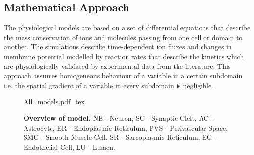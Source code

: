 \subsection{Mathematical Approach}
The physiological models are based on a set of differential equations that describe the mass conservation of ions and molecules passing from one cell or domain to another. The simulations describe time-dependent ion fluxes and changes in membrane potential modelled by reaction rates that describe the kinetics which are physiologically validated by experimental data from the literature. This approach assumes homogeneous behaviour of a variable in a certain subdomain i.e. the spatial gradient of a variable in every subdomain is negligible.

 \begin{figure}[h!]
   \centering
   \def\svgwidth{450pt}
   \scriptsize 
   {All_models.pdf_tex}
   \caption{\textbf{Overview of model.}  \gls{NE} - Neuron, \gls{SC} - Synaptic Cleft, \gls{AC}  - Astrocyte,  \gls{ER}  - Endoplasmic Reticulum,  \gls{PVS}  - Perivascular Space,  \gls{SMC}  - Smooth Muscle Cell, SR - Sarcoplasmic Reticulum,  \gls{EC}  - Endothelial Cell,     \gls{LU}  - Lumen. }
 \label{Overview1}
 \end{figure}


